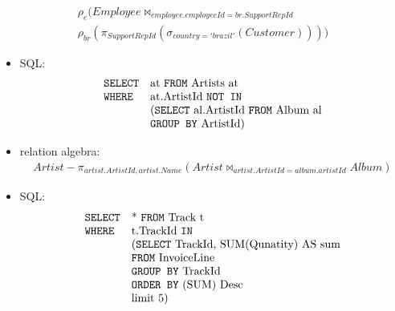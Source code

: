 \begin{exercise}{16}
\begin{subexercise}
\begin{itemize}
\begin{displaymath}
\begin{array}{l}
            \rho_{e}(Employee \bowtie_{employee.employeeId = br.SupportRepId}\\
            \rho_{br}(\pi_{SupportRepId}(\sigma_{country='brazil'}(Customer))))
          \end{array}
        \end{displaymath}
    \end{itemize}
  \end{subexercise}
  \begin{subexercise}
    \begin{itemize}
      \item SQL:
        \begin{displaymath}
          \begin{array}{l l}
            \text{\texttt{SELECT}}& \text{at \texttt{FROM} Artists at}\\
            \text{\texttt{WHERE}} & \text{at.ArtistId \texttt{NOT IN}}\\
                                  & (\text{\texttt{SELECT} al.ArtistId \texttt{FROM} Album al}\\
                                  & \text{\texttt{GROUP BY} ArtistId}) \\
          \end{array}
        \end{displaymath}
      \item relation algebra:
        \begin{displaymath}
          \begin{array} {l}
            Artist - \pi_{artist.ArtistId,artist.Name}(Artist\bowtie_{artist.ArtistId = album.artistId} Album)
          \end{array}
        \end{displaymath}
    \end{itemize}
  \end{subexercise}
  \begin{subexercise}
    \begin{itemize}
      \item SQL:
        \begin{displaymath}
          \begin{array}{l l}
            \text{\texttt{SELECT}}& \text{* \texttt{FROM} Track t}\\
            \text{\texttt{WHERE}} & \text{t.TrackId \texttt{IN}}\\
                                  & (\text{\texttt{SELECT} TrackId, SUM(Qunatity) AS sum}\\
                                  & \text{\texttt{FROM} InvoiceLine} \\
                                  & \text{\texttt{GROUP BY} TrackId}\\
                                  & \text{\texttt{ORDER BY} (SUM) Desc}\\
                                  & \text{limit 5)}


\end{array}
\end{displaymath}
\end{itemize}
\end{subexercise}
\end{exercise}
